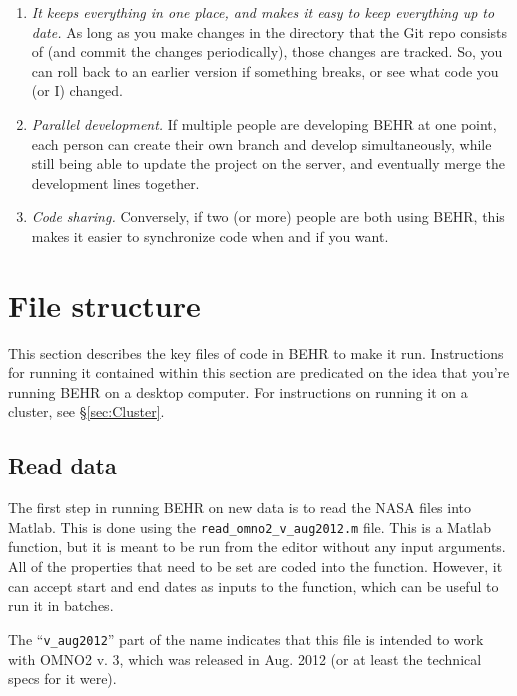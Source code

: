 \documentclass[12pt]{article}
\begin{document}
	\begin{enumerate}
	 \item \emph{It keeps everything in one place, and makes it easy to keep everything up to date.} As long as you make changes in the directory that the Git repo consists of (and commit the changes periodically), those changes are tracked.  So, you can roll back to an earlier version if something breaks, or see what code you (or I) changed.
	 \item \emph{Parallel development.}  If multiple people are developing BEHR at one point, each person can create their own branch and develop simultaneously, while still being able to update the project on the server, and eventually merge the development lines together.
	 \item \emph{Code sharing.} Conversely, if two (or more) people are both using BEHR, this makes it easier to synchronize code when and if you want.
	\end{enumerate}

\section{File structure}
	This section describes the key files of code in BEHR to make it run.  Instructions for running it contained within this section are predicated on the idea that you're running BEHR on a desktop computer.  For instructions on running it on a cluster, see \S\ref{sec:Cluster}.

	\subsection{Read data}
	
	The first step in running BEHR on new data is to read the NASA files into Matlab.  This is done using the {\lstinline[breaklines=true]|read_omno2_v_aug2012.m|} file.  This is a Matlab function, but it is meant to be run from the editor without any input arguments. All of the properties that need to be set are coded into the function.  However, it can accept start and end dates as inputs to the function, which can be useful to run it in batches.
	
	 The ``{\lstinline[breaklines=true]|v_aug2012|}'' part of the name indicates that this file is intended to work with OMNO2 v. 3, which was released in Aug. 2012 (or at least the technical specs for it were).  
	 
\end{document}
